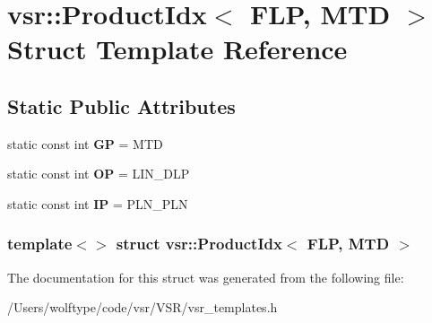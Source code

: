 \hypertarget{structvsr_1_1_product_idx_3_01_f_l_p_00_01_m_t_d_01_4}{\section{vsr\-:\-:Product\-Idx$<$ F\-L\-P, M\-T\-D $>$ Struct Template Reference}
\label{structvsr_1_1_product_idx_3_01_f_l_p_00_01_m_t_d_01_4}
}
\subsection*{Static Public Attributes}
\begin{DoxyCompactItemize}
\item 
\hypertarget{structvsr_1_1_product_idx_3_01_f_l_p_00_01_m_t_d_01_4_adc7aadd1482888f012c7195d185e744a}{static const int {\bfseries G\-P} = M\-T\-D}\label{structvsr_1_1_product_idx_3_01_f_l_p_00_01_m_t_d_01_4_adc7aadd1482888f012c7195d185e744a}

\item 
\hypertarget{structvsr_1_1_product_idx_3_01_f_l_p_00_01_m_t_d_01_4_adbf3e2cb766306c9c73a89e5a02bc5c6}{static const int {\bfseries O\-P} = L\-I\-N\-\_\-\-D\-L\-P}\label{structvsr_1_1_product_idx_3_01_f_l_p_00_01_m_t_d_01_4_adbf3e2cb766306c9c73a89e5a02bc5c6}

\item 
\hypertarget{structvsr_1_1_product_idx_3_01_f_l_p_00_01_m_t_d_01_4_a79a4015bbc6d2c188330ee776a80917a}{static const int {\bfseries I\-P} = P\-L\-N\-\_\-\-P\-L\-N}\label{structvsr_1_1_product_idx_3_01_f_l_p_00_01_m_t_d_01_4_a79a4015bbc6d2c188330ee776a80917a}

\end{DoxyCompactItemize}
\subsubsection*{template$<$$>$ struct vsr\-::\-Product\-Idx$<$ F\-L\-P, M\-T\-D $>$}



The documentation for this struct was generated from the following file\-:\begin{DoxyCompactItemize}
\item 
/\-Users/wolftype/code/vsr/\-V\-S\-R/vsr\-\_\-templates.\-h\end{DoxyCompactItemize}
